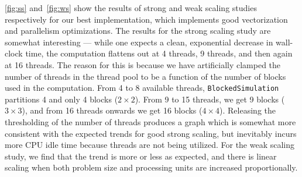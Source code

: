 \documentclass{scrartcl}
\begin{document}
  \autoref{fig:ss} and~\autoref{fig:ws} show the results of strong and weak scaling studies respectively for our best implementation, which implements good vectorization and parallelism optimizations. The results for the strong scaling study are somewhat interesting --- while one expects a clean, exponential decrease in wall-clock time, the computation flattens out at 4 threads, 9 threads, and then again at 16 threads. The reason for this is because we have artificially clamped the number of threads in the thread pool to be a function of the number of blocks used in the computation. From 4 to 8 available threads, \texttt{BlockedSimulation} partitions 4 and only 4 blocks ($2 \times 2$). From 9 to 15 threads, we get 9 blocks ($3 \times 3$), and from 16 threads onwards we get 16 blocks ($4 \times 4$). Releasing the thresholding of the number of threads produces a graph which is somewhat more consistent with the expected trends for good strong scaling, but inevitably incurs more CPU idle time because threads are not being utilized. For the weak scaling study, we find that the trend is more or less as expected, and there is linear scaling when both problem size and processing units are increased proportionally.
\end{document}
